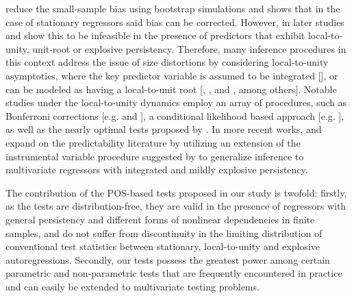 \documentclass[harvard,11pt]{article}
\begin{document}
\citet{nelson1993predictable} reduce the small-sample bias using bootstrap simulations and  \citet{stambaugh1999predictive} shows that in the case of stationary regressors said bias can be corrected. However, in later studies \citet{phillips2013predictive} and \citet{phillips2014confidence} show this to be infeasible in the presence of predictors that exhibit local-to-unity, unit-root or explosive persistency. Therefore, many inference procedures in this context address the issue of size distortions by considering local-to-unity asymptotics, where the key predictor variable is assumed to be integrated
[\citet{lewellen2004predicting}], or can be modeled as having a local-to-unit root [\citet{elliott1994inference}, \citet{torous2004predicting}, and \citet{campbell2006efficient}, among others]. Notable studies under the local-to-unity dynamics employ an array of procedures, such as Bonferroni corrections [e.g. \citet{cavanagh1995inference} and \citet{campbell2006efficient}], a conditional likelihood based approach [e.g. \citet{jansson2006optimal}], as well as the nearly optimal tests proposed by \citet{elliott2015nearly}. In more recent works, \citet{kostakis2015robust} and \citet{phillips2016robust} expand on the predictability literature by utilizing an extension of the instrumental variable procedure suggested by \citet{phillips2009econometric} to generalize inference to multivariate regressors with integrated and mildly explosive persistency. 

The contribution of the POS-based tests proposed in our study is twofold: firstly, as the tests are distribution-free, they are valid in the presence of regressors with general persistency and different forms of nonlinear dependencies in finite samples, and do not suffer from discontinuity in the limiting distribution of conventional test statistics between stationary, local-to-unity and explosive autoregressions. Secondly, our tests possess the greatest power among certain parametric and non-parametric tests that are frequently encountered in practice and can easily be extended to multivariate testing problems. 


\end{document}

